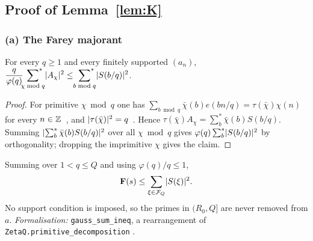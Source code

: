 \subsection{Proof of Lemma~\ref{lem:K}}\label{ssec:K-proof}

\subsubsection*{(a) The Farey majorant}
\begin{lemma}\label{lem:K-farey}
For every $q\ge1$ and every finitely supported $(a_n)$,
$\displaystyle\frac q{\varphi(q)}\sideset{}{^*}\sum_{\chi\bmod q}\lvert A_\chi\rvert^2\le\sideset{}{^*}\sum_{b\bmod q}\lvert S(b/q)\rvert^2$.
\end{lemma}
\begin{proof}
For primitive $\chi\bmod q$ one has $\sum_{b\bmod q}\bar\chi(b)e(bn/q)=\tau(\bar\chi)\chi(n)$ for every $n\in\mathbb Z$~\cite[\S9.1]{MV}, and
$\lvert \tau(\bar\chi)\rvert^2=q$~\cite[Thm.~9.7]{MV}. Hence $\tau(\bar\chi)A_\chi=\sum^*_b\bar\chi(b)S(b/q)$. Summing
$\lvert \sum^*_b\bar\chi(b)S(b/q)\rvert^2$ over all $\chi\bmod q$ gives $\varphi(q)\sum^*_b\lvert S(b/q)\rvert^2$ by orthogonality; dropping the
imprimitive $\chi$ gives the claim.
\end{proof}
Summing over $1<q\le Q$ and using $\varphi(q)/q\le1$,
\begin{equation}\label{eq:K-fareysum}
\mathbf F(s)\le\sum_{\xi\in\mathcal F_Q}\lvert S(\xi)\rvert^2 .
\end{equation}
No support condition is imposed, so the primes in $(R_0,Q]$ are never removed from $a$. \emph{Formalisation:}
\texttt{gauss\_sum\_ineq}, a rearrangement of \texttt{ZetaQ.primitive\_decomposition} \tagL.

